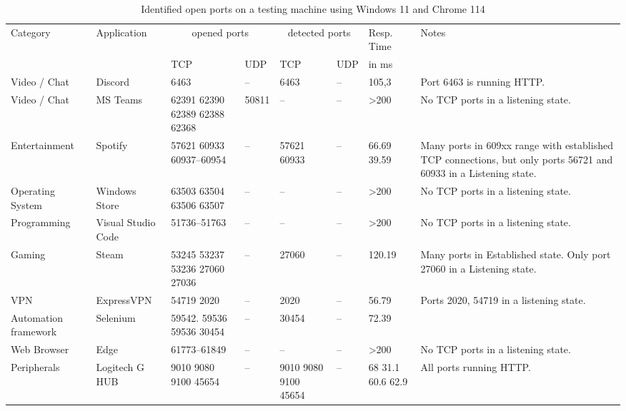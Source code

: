 \begin{table}[htbp]
\footnotesize
\centering
\begin{adjustwidth}{-1cm}{}
\begin{tabular}{p{2cm}p{2cm}p{1cm}p{1cm}p{1cm}p{1cm}p{1cm}p{5cm}}
    \toprule
    Category & Application & \multicolumn{2}{c}{opened ports} & \multicolumn{2}{c}{detected ports} & Resp. Time & Notes\\
     \cmidrule{3-4} \cmidrule{5-6} \cmidrule{7-7}
     & & TCP & UDP & TCP & UDP & in ms & \\
     \midrule
     Video / Chat & Discord & 6463 & -- & 6463 & -- & 105,3 & Port 6463 is running HTTP. \\
     Video / Chat & MS Teams & 62391 62390 62389 62388 62368 & 50811 & -- & -- & >200 & No TCP ports in a listening state. \\
     Entertainment & Spotify & 57621 60933 60937--60954 & -- & 57621 60933 & -- & 66.69 39.59 & Many ports in 609xx range with established TCP connections, but only ports 56721 and 60933 in a Listening state. \\ 
     Operating System & Windows Store & 63503 63504 63506 63507 & -- & -- & -- & >200 & No TCP ports in a listening state. \\ 
    Programming & Visual Studio Code & 51736--51763 & -- & -- & -- & >200 & No TCP ports in a listening state. \\ 
    Gaming & Steam & 53245 53237 53236 27060 27036 & -- & 27060 & -- & 120.19 & Many ports in Established state. Only port 27060 in a Listening state. \\ 
    VPN & ExpressVPN & 54719 2020 & -- & 2020 & -- & 56.79 & Ports 2020, 54719 in a listening state. \\ 
    Automation framework & Selenium & 59542. 59536 59536 30454 & -- & 30454 & -- & 72.39 & \\ 
    Web Browser & Edge & 61773--61849 & -- & -- & -- & >200 & No TCP ports in a listening state. \\ 
    Peripherals & Logitech G HUB & 9010 9080 9100 45654 & -- & 9010 9080 9100 45654 & -- & 68 31.1 60.6 62.9 & All ports running HTTP. \\ 
     \bottomrule
\end{tabular}
\end{adjustwidth}{}
\caption{Identified open ports on a testing machine using Windows 11 and Chrome 114}
\label{tab:identifying-applications}
\end{table}
\clearpage

